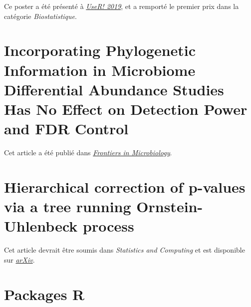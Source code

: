 \documentclass[12pt,a4paper]{reedthesis}
\theoremstyle{definition}
\theoremstyle{definition}
\theoremstyle{definition}
\theoremstyle{remark}
\begin{document}
Ce poster a été présenté à \href{https://www.user2019.fr/posters/}{\emph{UseR! 2019}}, et a remporté le premier prix dans la catégorie \emph{Biostatistique}.



\hypertarget{incorporating-phylogenetic-information-in-microbiome-differential-abundance-studies-has-no-effect-on-detection-power-and-fdr-control}{%
\section*{Incorporating Phylogenetic Information in Microbiome Differential Abundance Studies Has No Effect on Detection Power and FDR Control}\label{incorporating-phylogenetic-information-in-microbiome-differential-abundance-studies-has-no-effect-on-detection-power-and-fdr-control}}

Cet article a été publié dans \href{https://doi.org/10.3389/fmicb.2020.00649}{\emph{Frontiers in Microbiology}}.





\hypertarget{hierarchical-correction-of-p-values-via-a-tree-running-ornstein-uhlenbeck-process}{%
\section*{Hierarchical correction of p-values via a tree running Ornstein-Uhlenbeck process}\label{hierarchical-correction-of-p-values-via-a-tree-running-ornstein-uhlenbeck-process}}

Cet article devrait être soumis dans \emph{Statistics and Computing} et est disponible sur \href{http://arxiv.org/abs/2009.13335}{\emph{arXiv}}.



\hypertarget{packages-r}{%
\section*{Packages R}\label{packages-r}}
\end{document}
